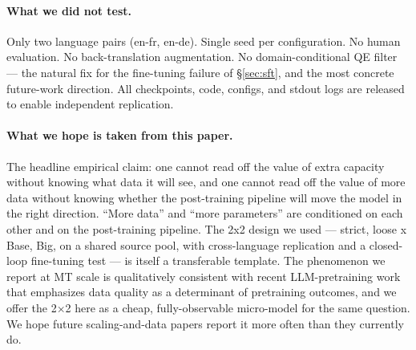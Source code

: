 \paragraph{What we did not test.}
Only two language pairs (en-fr, en-de). Single seed per configuration. No human evaluation. No back-translation augmentation. No domain-conditional QE filter --- the natural fix for the fine-tuning failure of \S\ref{sec:sft}, and the most concrete future-work direction. All checkpoints, code, configs, and stdout logs are released to enable independent replication.

\paragraph{What we hope is taken from this paper.}
The headline empirical claim: one cannot read off the value of extra capacity without knowing what data it will see, and one cannot read off the value of more data without knowing whether the post-training pipeline will move the model in the right direction. ``More data'' and ``more parameters'' are conditioned on each other and on the post-training pipeline. The 2x2 design we used --- {strict, loose} x {Base, Big}, on a shared source pool, with cross-language replication and a closed-loop fine-tuning test --- is itself a transferable template. The phenomenon we report at MT scale is qualitatively consistent with recent LLM-pretraining work~\cite{penedo2024fineweb, abdin2024phi3, grattafiori2024llama3} that emphasizes data quality as a determinant of pretraining outcomes, and we offer the 2$\times$2 here as a cheap, fully-observable micro-model for the same question. We hope future scaling-and-data papers report it more often than they currently do.
